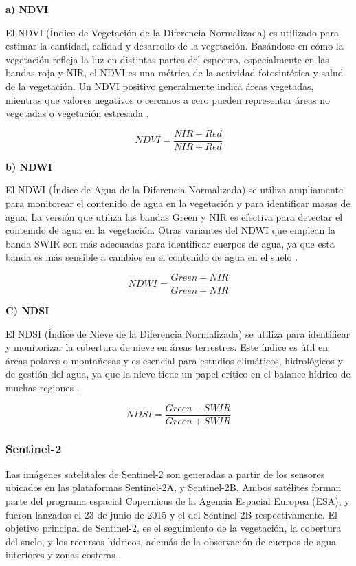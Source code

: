 \textbf{a) NDVI}

El NDVI (Índice de Vegetación de la Diferencia Normalizada) es utilizado para estimar la cantidad, calidad y desarrollo de la vegetación. Basándose en cómo la vegetación refleja la luz en distintas partes del espectro, especialmente en las bandas roja y NIR, el NDVI es una métrica de la actividad fotosintética y salud de la vegetación. Un NDVI positivo generalmente indica áreas vegetadas, mientras que valores negativos o cercanos a cero pueden representar áreas no vegetadas o vegetación estresada \cite{rouse1974monitoring}.

\begin{equation*}
    NDVI = \frac{NIR - Red}{NIR + Red}
\end{equation*}

\textbf{b) NDWI}

El NDWI (Índice de Agua de la Diferencia Normalizada) se utiliza ampliamente para monitorear el contenido de agua en la vegetación y para identificar masas de agua. La versión que utiliza las bandas Green y NIR es efectiva para detectar el contenido de agua en la vegetación. Otras variantes del NDWI que emplean la banda SWIR son más adecuadas para identificar cuerpos de agua, ya que esta banda es más sensible a cambios en el contenido de agua en el suelo \cite{gao1996ndwi}.

\begin{equation*}
    NDWI = \frac{Green - NIR}{Green + NIR}
\end{equation*}

\textbf{C) NDSI}

El NDSI (Índice de Nieve de la Diferencia Normalizada) se utiliza para identificar y monitorizar la cobertura de nieve en áreas terrestres. Este índice es útil en áreas polares o montañosas y es esencial para estudios climáticos, hidrológicos y de gestión del agua, ya que la nieve tiene un papel crítico en el balance hídrico de muchas regiones \cite{dozier1989spectral}.

\begin{equation*}
    NDSI = \frac{Green - SWIR}{Green + SWIR}
\end{equation*}

\subsubsection{Sentinel-2}

Las imágenes satelitales de Sentinel-2 son generadas a partir de los sensores ubicados en las plataformas Sentinel-2A, y Sentinel-2B. Ambos satélites forman parte del programa espacial Copernicus de la Agencia Espacial Europea (ESA), y fueron lanzados el 23 de junio de 2015 y el del Sentinel-2B respectivamente. El objetivo principal de Sentinel-2, es el seguimiento de la vegetación, la cobertura del suelo, y los recursos hídricos, además de la observación de cuerpos de agua interiores y zonas costeras \cite{sentinel2}.

